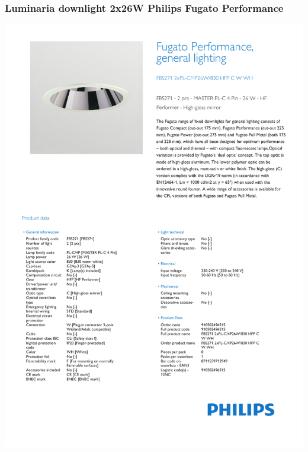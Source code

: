 \subsubsection{Luminaria downlight 2x26W Philips Fugato Performance}
\hspace*{-2cm}
\includegraphics[page=1]{Datasheets/ph1.pdf}
\newpage
\hspace*{-2cm}
